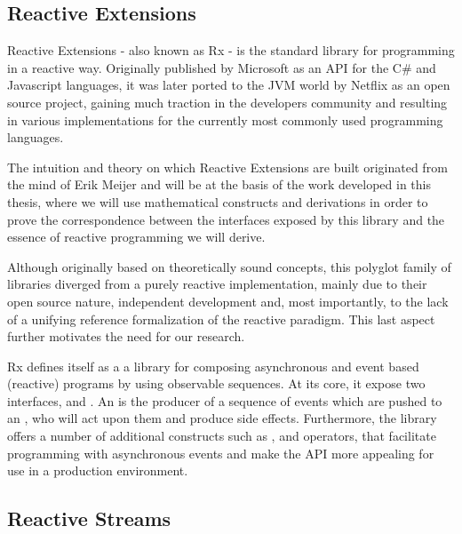 
\subsection{Reactive Extensions}
\label{subsec:rx}

Reactive Extensions - also known as Rx - is the standard library for programming in a reactive way. Originally published by Microsoft as an API for the C\# and Javascript languages, it was later ported to the JVM world by Netflix as an open source project, gaining much traction in the developers community and resulting in various implementations for the currently most commonly used programming languages\cite{ReactiveX}.

The intuition and theory on which Reactive Extensions are built originated from the mind of Erik Meijer\cite{meijer2010observable} and will be at the basis of the work developed in this thesis, where we will use mathematical constructs and derivations in order to prove the correspondence between the interfaces exposed by this library and the essence of reactive programming we will derive.

Although originally based on theoretically sound concepts, this polyglot family of libraries diverged from a purely reactive implementation, mainly due to their open source nature, independent development and, most importantly, to the lack of a unifying reference formalization of the reactive paradigm. This last aspect further motivates the need for our research.

Rx defines itself as a a library for composing asynchronous and event based (reactive) programs by using observable sequences\cite{Rx.Net}. At its core, it expose two interfaces,  and . An  is the producer of a sequence of events which are pushed to an , who will act upon them and produce side effects. Furthermore, the library offers a number of additional constructs such as ,  and operators, that facilitate programming with asynchronous events and make the API more appealing for use in a production environment.

\subsection{Reactive Streams}

